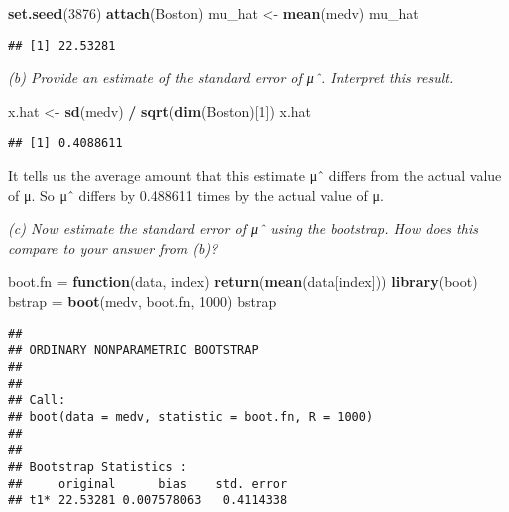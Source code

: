 \documentclass[]{article}
\newenvironment{Shaded}{\begin{snugshade}}{\end{snugshade}}
\newcommand{\KeywordTok}[1]{\textcolor[rgb]{0.13,0.29,0.53}{\textbf{#1}}}
\newcommand{\DecValTok}[1]{\textcolor[rgb]{0.00,0.00,0.81}{#1}}
\newcommand{\StringTok}[1]{\textcolor[rgb]{0.31,0.60,0.02}{#1}}
\newcommand{\ControlFlowTok}[1]{\textcolor[rgb]{0.13,0.29,0.53}{\textbf{#1}}}
\newcommand{\OperatorTok}[1]{\textcolor[rgb]{0.81,0.36,0.00}{\textbf{#1}}}
\newcommand{\NormalTok}[1]{#1}
\begin{document}
\begin{Shaded}
\begin{Highlighting}[]
\KeywordTok{set.seed}\NormalTok{(}\DecValTok{3876}\NormalTok{)}
\KeywordTok{attach}\NormalTok{(Boston)}
\NormalTok{mu_hat <-}\StringTok{ }\KeywordTok{mean}\NormalTok{(medv)}
\NormalTok{mu_hat}
\end{Highlighting}
\end{Shaded}

\begin{verbatim}
## [1] 22.53281
\end{verbatim}

\emph{(b) Provide an estimate of the standard error of μˆ. Interpret
this result. }

\begin{Shaded}
\begin{Highlighting}[]
\NormalTok{x.hat <-}\StringTok{ }\KeywordTok{sd}\NormalTok{(medv) }\OperatorTok{/}\StringTok{ }\KeywordTok{sqrt}\NormalTok{(}\KeywordTok{dim}\NormalTok{(Boston)[}\DecValTok{1}\NormalTok{])}
\NormalTok{x.hat}
\end{Highlighting}
\end{Shaded}

\begin{verbatim}
## [1] 0.4088611
\end{verbatim}

It tells us the average amount that this estimate μˆ differs from the
actual value of μ. So μˆ differs by 0.488611 times by the actual value
of μ.

\emph{(c) Now estimate the standard error of μˆ using the bootstrap. How
does this compare to your answer from (b)? }

\begin{Shaded}
\begin{Highlighting}[]
\NormalTok{boot.fn =}\StringTok{ }\ControlFlowTok{function}\NormalTok{(data, index) }\KeywordTok{return}\NormalTok{(}\KeywordTok{mean}\NormalTok{(data[index]))}
\KeywordTok{library}\NormalTok{(boot)}
\NormalTok{bstrap =}\StringTok{ }\KeywordTok{boot}\NormalTok{(medv, boot.fn, }\DecValTok{1000}\NormalTok{)}
\NormalTok{bstrap}
\end{Highlighting}
\end{Shaded}

\begin{verbatim}
## 
## ORDINARY NONPARAMETRIC BOOTSTRAP
## 
## 
## Call:
## boot(data = medv, statistic = boot.fn, R = 1000)
## 
## 
## Bootstrap Statistics :
##     original      bias    std. error
## t1* 22.53281 0.007578063   0.4114338
\end{verbatim}
\end{document}
